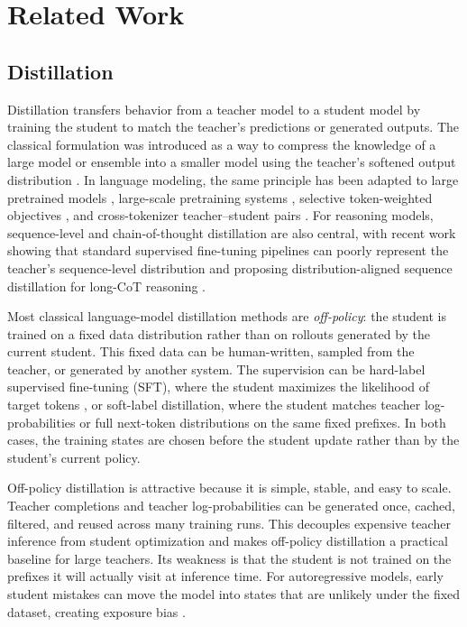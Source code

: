 \chapter{Related Work}
\label{sec:related-work}

\section{Distillation}

Distillation transfers behavior from a teacher model to a student model by training the student to match the teacher's predictions or generated outputs. The classical formulation was introduced as a way to compress the knowledge of a large model or ensemble into a smaller model using the teacher's softened output distribution \citep{hintonDistillingKnowledgeNeural2015}. In language modeling, the same principle has been adapted to large pretrained models \citep{tan2023GKDGeneralKnowledge}, large-scale pretraining systems \citep{wang2021ERNIE30Titan}, selective token-weighted objectives \citep{huang2025SelecTKDSelectiveTokenWeighted}, and cross-tokenizer teacher--student pairs \citep{boizardCrossTokenizerDistillationUniversal2025,minixhoferUniversalCrossTokenizerDistillation2025}. For reasoning models, sequence-level and chain-of-thought distillation are also central, with recent work showing that standard supervised fine-tuning pipelines can poorly represent the teacher's sequence-level distribution and proposing distribution-aligned sequence distillation for long-CoT reasoning \citep{yanDistributionAlignedSequenceDistillation2026}.

Most classical language-model distillation methods are \emph{off-policy}: the student is trained on a fixed data distribution rather than on rollouts generated by the current student. This fixed data can be human-written, sampled from the teacher, or generated by another system. The supervision can be hard-label supervised fine-tuning (SFT), where the student maximizes the likelihood of target tokens \citep{zotero-item-425}, or soft-label distillation, where the student matches teacher log-probabilities or full next-token distributions on the same fixed prefixes. In both cases, the training states are chosen before the student update rather than by the student's current policy.

Off-policy distillation is attractive because it is simple, stable, and easy to scale. Teacher completions and teacher log-probabilities can be generated once, cached, filtered, and reused across many training runs. This decouples expensive teacher inference from student optimization and makes off-policy distillation a practical baseline for large teachers. Its weakness is that the student is not trained on the prefixes it will actually visit at inference time. For autoregressive models, early student mistakes can move the model into states that are unlikely under the fixed dataset, creating exposure bias \citep{pmlr-v9-ross10a}.

